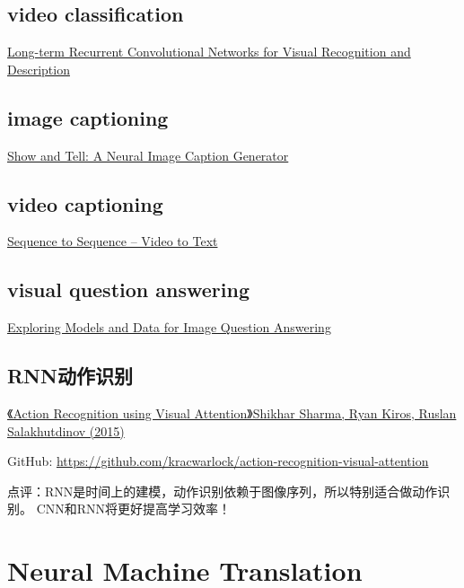 \subsection{video classification}
\href{https://arxiv.org/abs/1411.4389}{Long-term Recurrent Convolutional Networks for Visual Recognition and Description}

\subsection{image captioning}
\href{https://arxiv.org/pdf/1411.4555.pdf}{Show and Tell: A Neural Image Caption Generator}

\subsection{video captioning}
\href{https://arxiv.org/abs/1505.00487}{Sequence to Sequence -- Video to Text}


\subsection{visual question answering}
\href{https://arxiv.org/abs/1505.02074}{Exploring Models and Data for Image Question Answering}


\subsection{RNN动作识别}
\href{http://t.cn/RU8EKNZ}{《Action Recognition using Visual Attention》Shikhar Sharma, Ryan Kiros, Ruslan Salakhutdinov (2015)}

GitHub: \url{https://github.com/kracwarlock/action-recognition-visual-attention}

点评：RNN是时间上的建模，动作识别依赖于图像序列，所以特别适合做动作识别。 CNN和RNN将更好提高学习效率！

\section{Neural Machine Translation}

